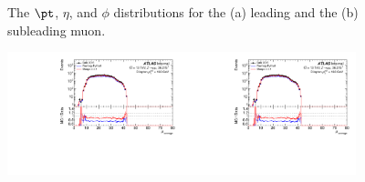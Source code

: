 \begin{figure}[h!]
  \caption{The $\pt$, $\eta$, and $\phi$ distributions for the (a) leading and the (b) subleading muon.}
  \label{fig:pTetamus}
\end{figure}

\begin{figure}[h!]
  \centering
  \includegraphics[page=72,width=0.45\textwidth]{figures/ZjetOmnifoldMCDataComp.pdf}\includegraphics[page=76,width=0.45\textwidth]{figures/ZjetOmnifoldMCDataComp.pdf} \\
   \\

\end{figure}
